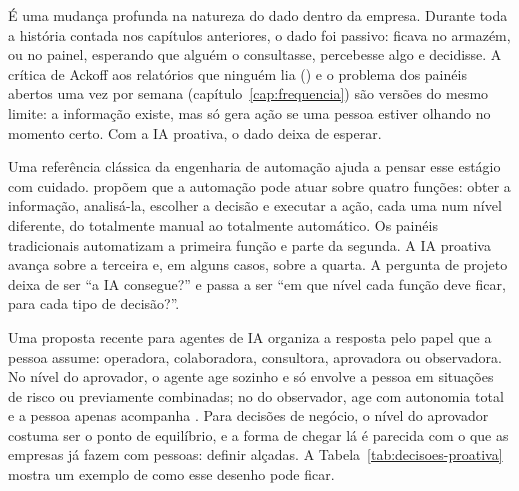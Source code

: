 É uma mudança profunda na natureza do dado dentro da empresa. Durante toda a história contada
nos capítulos anteriores, o dado foi passivo: ficava no armazém, ou no painel, esperando que
alguém o consultasse, percebesse algo e decidisse. A crítica de Ackoff aos relatórios que
ninguém lia () e o problema dos painéis abertos uma vez por semana
(capítulo~\ref{cap:frequencia}) são versões do mesmo limite: a informação existe, mas só gera
ação se uma pessoa estiver olhando no momento certo. Com a IA proativa, o dado deixa de
esperar.

Uma referência clássica da engenharia de automação ajuda a pensar esse estágio com cuidado.
\textcite{parasuraman2000} propõem que a automação pode atuar sobre quatro funções: obter a
informação, analisá-la, escolher a decisão e executar a ação, cada uma num nível diferente,
do totalmente manual ao totalmente automático. Os painéis tradicionais automatizam a primeira
função e parte da segunda. A IA proativa avança sobre a terceira e, em alguns casos, sobre a
quarta. A pergunta de projeto deixa de ser \enquote{a IA consegue?} e passa a ser \enquote{em
que nível cada função deve ficar, para cada tipo de decisão?}.

Uma proposta recente para agentes de IA organiza a resposta pelo papel que a pessoa assume:
operadora, colaboradora, consultora, aprovadora ou observadora. No nível do aprovador, o agente
age sozinho e só envolve a pessoa em situações de risco ou previamente combinadas; no do
observador, age com autonomia total e a pessoa apenas acompanha \parencite{feng2025}. Para
decisões de negócio, o nível do aprovador costuma ser o ponto de equilíbrio, e a forma de
chegar lá é parecida com o que as empresas já fazem com pessoas: definir alçadas. A
Tabela~\ref{tab:decisoes-proativa} mostra um exemplo de como esse desenho pode ficar.


